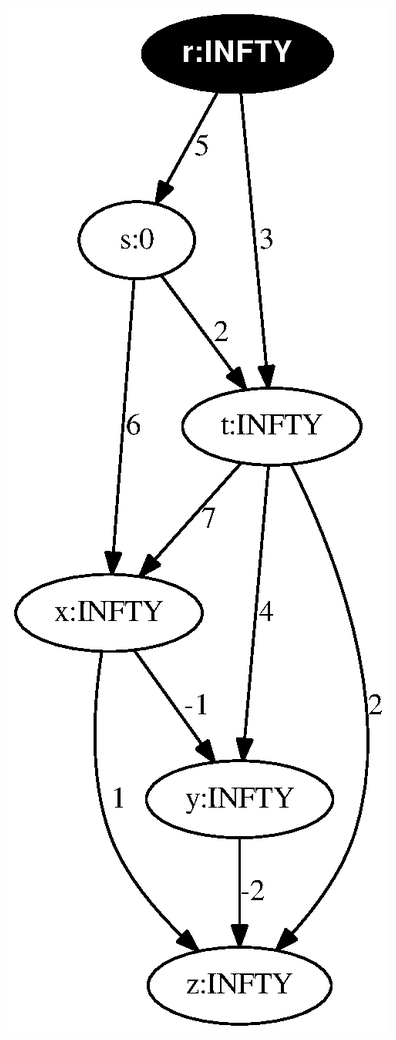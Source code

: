 \documentclass{article}
\begin{document}
\vspace{1em}
\includegraphics[height=.3\textheight]{dag_shortest_path_01.eps}
\vspace{1em}
\end{document}
